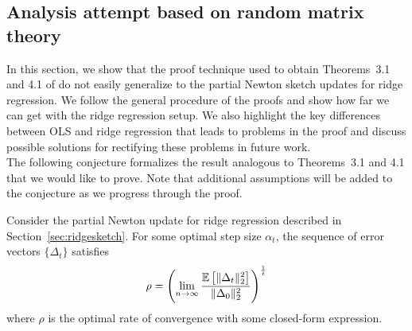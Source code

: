 \subsection{Analysis attempt based on random matrix theory} \label{sec:theory}

In this section, we show that the proof technique used to obtain Theorems~3.1 and 4.1 of \citep{Lacotte:2020} do not easily generalize to the partial Newton sketch updates for ridge regression. We follow the general procedure of the proofs and show how far we can get with the ridge regression setup. We also highlight the key differences between OLS and ridge regression that leads to problems in the proof and discuss possible solutions for rectifying these problems in future work.
\\

The following conjecture formalizes the result analogous to Theorems~3.1 and 4.1 that we would like to prove. Note that additional assumptions will be added to the conjecture as we progress through the proof.

\begin{conjecture} \label{con:ridge}
Consider the partial Newton update for ridge regression described in Section~\ref{sec:ridgesketch}. For some optimal step size $\alpha_t$, the sequence of error vectors $\{\Delta_t\}$ satisfies
\[
\rho = \left(\lim_{n\rightarrow\infty}\frac{\mathbb{E}\left[\|\Delta_t\|_2^2\right]}{\|\Delta_0\|_2^2}\right)^\frac{1}{t}
\]
where $\rho$ is the optimal rate of convergence with some closed-form expression.
\end{conjecture}

